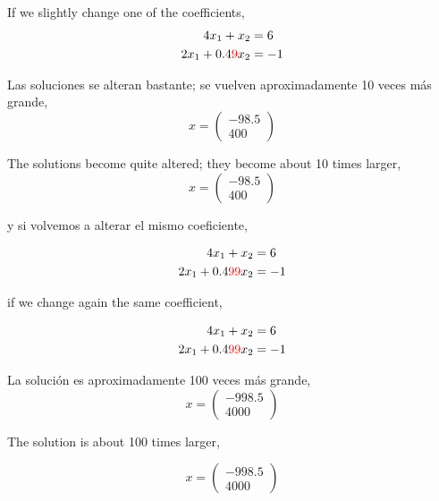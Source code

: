\begin{paracol}{2}
\switchcolumn

If we slightly change one of the coefficients,
\begin{align*}
4x_1+x_2&=6\\
2x_1+0.4{\color{red}9} x_2&=-1
\end{align*}

\switchcolumn

Las soluciones se alteran bastante;  se vuelven aproximadamente 10 veces más grande,
\begin{equation*}
x=\begin{pmatrix}
-98.5\\
400
\end{pmatrix}
\end{equation*}

\switchcolumn

The solutions become quite altered; they become about 10 times larger,
\begin{equation*}
x=\begin{pmatrix}
-98.5\\
400
\end{pmatrix}
\end{equation*}

\switchcolumn
y si volvemos a alterar el mismo coeficiente,

\begin{align*}
4x_1+x_2&=6\\
2x_1+0.4{\color{red}99} x_2&=-1
\end{align*}

\switchcolumn

if we change again the same coefficient,

\begin{align*}
4x_1+x_2&=6\\
2x_1+0.4{\color{red}99} x_2&=-1
\end{align*}

\switchcolumn

La solución es aproximadamente 100 veces más grande,
\begin{equation*}
x=\begin{pmatrix}
-998.5\\
4000
\end{pmatrix}
\end{equation*}

\switchcolumn

The solution is about 100 times larger,

\begin{equation*}
x=\begin{pmatrix}
-998.5\\
4000
\end{pmatrix}
\end{equation*}


\end{paracol}
